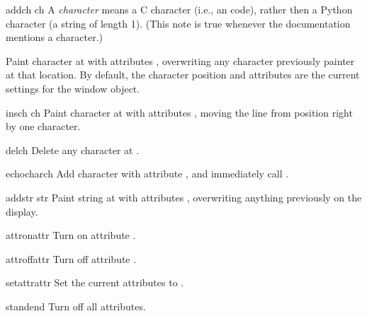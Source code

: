 \begin{methoddesc}{addch}{ ch}
 A \emph{character} means a C character (i.e., an
\ASCII{} code), rather then a Python character (a string of length 1).
(This note is true whenever the documentation mentions a character.)

Paint character  at  with attributes
, overwriting any character previously painter at that
location.  By default, the character position and attributes are the
current settings for the window object.
\end{methoddesc}

\begin{methoddesc}{insch}{ ch}
Paint character  at  with attributes
, moving the line from position  right by one
character.
\end{methoddesc}

\begin{methoddesc}{delch}{}
Delete any character at .
\end{methoddesc}

\begin{methoddesc}{echochar}{ch}
Add character  with attribute , and immediately 
call .
\end{methoddesc}

\begin{methoddesc}{addstr}{ str}
Paint string  at  with attributes
, overwriting anything previously on the display.
\end{methoddesc}

\begin{methoddesc}{attron}{attr}
Turn on attribute .
\end{methoddesc}

\begin{methoddesc}{attroff}{attr}
Turn off attribute .
\end{methoddesc}

\begin{methoddesc}{setattr}{attr}
Set the current attributes to .
\end{methoddesc}

\begin{methoddesc}{standend}{}
Turn off all attributes.
\end{methoddesc}


